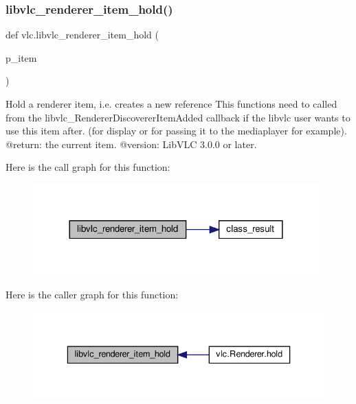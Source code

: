 \subsubsection{\texorpdfstring{libvlc\+\_\+renderer\+\_\+item\+\_\+hold()}{libvlc\_renderer\_item\_hold()}}
{\footnotesize\ttfamily def vlc.\+libvlc\+\_\+renderer\+\_\+item\+\_\+hold (\begin{DoxyParamCaption}\item[{}]{p\+\_\+item }\end{DoxyParamCaption})}

\begin{DoxyVerb}Hold a renderer item, i.e. creates a new reference
This functions need to called from the libvlc_RendererDiscovererItemAdded
callback if the libvlc user wants to use this item after. (for display or
for passing it to the mediaplayer for example).
@return: the current item.
@version: LibVLC 3.0.0 or later.
\end{DoxyVerb}
 Here is the call graph for this function\+:
\nopagebreak
\begin{figure}[H]
\begin{center}
\leavevmode
\includegraphics[width=312pt]{namespacevlc_a18b5ce5a1f7fedb1834c9f80d444b08e_cgraph}
\end{center}
\end{figure}
Here is the caller graph for this function\+:
\nopagebreak
\begin{figure}[H]
\begin{center}
\leavevmode
\includegraphics[width=336pt]{namespacevlc_a18b5ce5a1f7fedb1834c9f80d444b08e_icgraph}
\end{center}
\end{figure}
\mbox{\label{namespacevlc_a52e4801a24e87686f2503e8314b0faf9}} 
